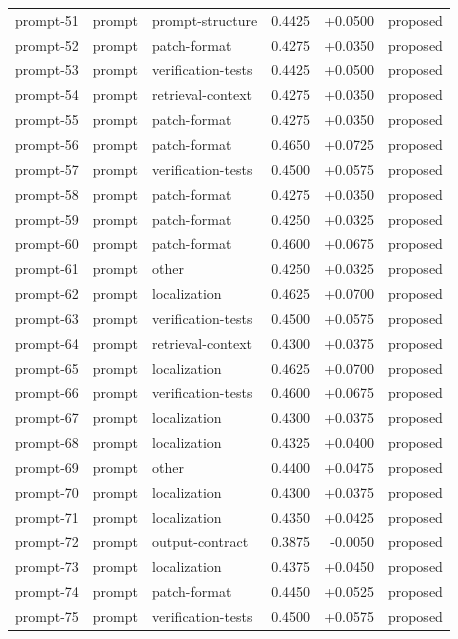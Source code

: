 \begin{center}
\begin{longtable}{llp{5.2cm}rrl}
prompt-51 & prompt & prompt-structure & 0.4425 & +0.0500 & proposed \\
prompt-52 & prompt & patch-format & 0.4275 & +0.0350 & proposed \\
prompt-53 & prompt & verification-tests & 0.4425 & +0.0500 & proposed \\
prompt-54 & prompt & retrieval-context & 0.4275 & +0.0350 & proposed \\
prompt-55 & prompt & patch-format & 0.4275 & +0.0350 & proposed \\
prompt-56 & prompt & patch-format & 0.4650 & +0.0725 & proposed \\
prompt-57 & prompt & verification-tests & 0.4500 & +0.0575 & proposed \\
prompt-58 & prompt & patch-format & 0.4275 & +0.0350 & proposed \\
prompt-59 & prompt & patch-format & 0.4250 & +0.0325 & proposed \\
prompt-60 & prompt & patch-format & 0.4600 & +0.0675 & proposed \\
prompt-61 & prompt & other & 0.4250 & +0.0325 & proposed \\
prompt-62 & prompt & localization & 0.4625 & +0.0700 & proposed \\
prompt-63 & prompt & verification-tests & 0.4500 & +0.0575 & proposed \\
prompt-64 & prompt & retrieval-context & 0.4300 & +0.0375 & proposed \\
prompt-65 & prompt & localization & 0.4625 & +0.0700 & proposed \\
prompt-66 & prompt & verification-tests & 0.4600 & +0.0675 & proposed \\
prompt-67 & prompt & localization & 0.4300 & +0.0375 & proposed \\
prompt-68 & prompt & localization & 0.4325 & +0.0400 & proposed \\
prompt-69 & prompt & other & 0.4400 & +0.0475 & proposed \\
prompt-70 & prompt & localization & 0.4300 & +0.0375 & proposed \\
prompt-71 & prompt & localization & 0.4350 & +0.0425 & proposed \\
prompt-72 & prompt & output-contract & 0.3875 & -0.0050 & proposed \\
prompt-73 & prompt & localization & 0.4375 & +0.0450 & proposed \\
prompt-74 & prompt & patch-format & 0.4450 & +0.0525 & proposed \\
prompt-75 & prompt & verification-tests & 0.4500 & +0.0575 & proposed \\

\end{longtable}
\end{center}

